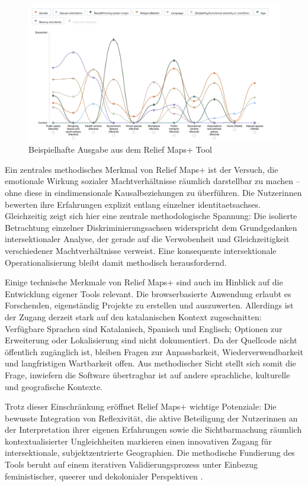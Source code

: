 \begin{figure}[htbp]
    \centering
    \includegraphics[width=\textwidth]{Arbeit/images/reliefmap.png}
    \caption{Beispielhafte Ausgabe aus dem Relief Maps+ Tool}
    \label{fig:relief_maps_plus_screenshot_1}
\end{figure}

Ein zentrales methodisches Merkmal von Relief Maps+ ist der Versuch, die emotionale Wirkung sozialer Machtverhältnisse räumlich darstellbar zu machen -- ohne diese in eindimensionale Kausalbeziehungen zu überführen. Die Nutzer\genderstern innen bewerten ihre Erfahrungen explizit entlang einzelner \glspl{identitaetsachse}. Gleichzeitig zeigt sich hier eine zentrale methodologische Spannung: Die isolierte Betrachtung einzelner Diskriminierungsachsen widerspricht dem Grundgedanken intersektionaler Analyse, der gerade auf die Verwobenheit und Gleichzeitigkeit verschiedener Machtverhältnisse verweist. Eine konsequente intersektionale Operationalisierung bleibt damit methodisch herausfordernd.

Einige technische Merkmale von Relief Maps+ sind auch im Hinblick auf die Entwicklung eigener Tools relevant. Die browserbasierte Anwendung erlaubt es Forschenden, eigenständig Projekte zu erstellen und auszuwerten. Allerdings ist der Zugang derzeit stark auf den katalanischen Kontext zugeschnitten: Verfügbare Sprachen sind Katalanisch, Spanisch und Englisch; Optionen zur Erweiterung oder Lokalisierung sind nicht dokumentiert. Da der Quellcode nicht öffentlich zugänglich ist, bleiben Fragen zur Anpassbarkeit, Wiederverwendbarkeit und langfristigen Wartbarkeit offen. Aus methodischer Sicht stellt sich somit die Frage, inwiefern die Software übertragbar ist auf andere sprachliche, kulturelle und geografische Kontexte.

Trotz dieser Einschränkung eröffnet Relief Maps+ wichtige Potenziale: Die bewusste Integration von Reflexivität, die aktive Beteiligung der Nutzer\genderstern innen an der Interpretation ihrer eigenen Erfahrungen sowie die Sichtbarmachung räumlich kontextualisierter Ungleichheiten markieren einen innovativen Zugang für intersektionale, subjektzentrierte Geographien. Die methodische Fundierung des Tools beruht auf einem iterativen Validierungsprozess unter Einbezug feministischer, queerer und dekolonialer Perspektiven \parencite{luizdesouzaSpiralValidationProcess2025}.



